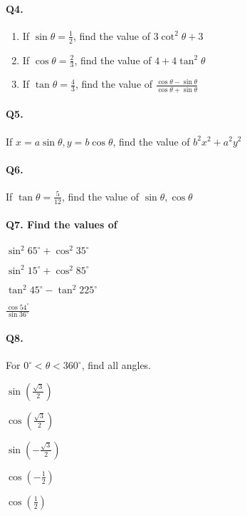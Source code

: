 \documentclass{article}
\begin{document}
\paragraph{Q4.}
\begin{enumerate}[label=\alph*)]
  \item If $\sin\theta = \frac{1}{2}$, find the value of $3\cot^{2}\theta+3$
  \item If $\cos\theta = \frac{2}{3}$, find the value of $4+4\tan^{2}\theta$
  \item If $\tan\theta = \frac{4}{3}$, find the value of $\frac{\cos\theta - \sin\theta}{\cos\theta + \sin\theta}$
\end{enumerate}

\paragraph{Q5.}
If $x = a\sin\theta, y = b\cos\theta$, find the value of $b^{2}x^{2}+a^{2}y^{2}$

\paragraph{Q6.}
If $\tan\theta = \frac{5}{12}$, find the value of $\sin\theta, \cos\theta$

\paragraph{Q7. Find the values of}
\begin{enumerate*}[label=\alph*)]
          \item $\sin^{2}65^{\circ} + \cos^{2}35^{\circ}$
          \item $\sin^{2}15^{\circ} + \cos^{2}85^{\circ}$
          \item $\tan^{2}45^{\circ} - \tan^{2}225^{\circ}$
          \item $\frac{\cos54^{\circ}}{\sin36^{\circ}}$
\end{enumerate*}

\paragraph{Q8.}
For $0^{\circ}<\theta<360^{\circ}$, find all angles.

\begin{enumerate*}[label=\alph*.]
          \item $\sin(\frac{\sqrt{3}}{2})$
          \item $\cos(\frac{\sqrt{3}}{2})$
          \item $\sin(-\frac{\sqrt{3}}{2})$
          \item $\cos(-\frac{1}{2})$
          \item $\cos(\frac{1}{2})$
\end{enumerate*}
\end{document}
